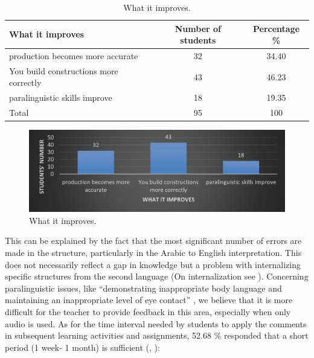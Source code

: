 \documentclass[english]{textolivre}
\begin{document}
\begin{table}[h!]
\centering
\begin{threeparttable}
\caption{What it improves.}
\label{tbl8}
\centering
\begin{tabular}{p{} c c}
\toprule
What it improves & Number of students & Percentage \% \\ \midrule
production becomes more accurate & 32 & 34.40 \\
You build constructions more correctly & 43 & 46.23 \\
paralinguistic skills improve & 18 & 19.35 \\
Total & 95 & 100 \\
\bottomrule
\end{tabular}
\end{threeparttable}
\end{table}

\begin{figure}[h!]
 \centering
 \begin{minipage}{.85\textwidth}
 \includegraphics[width=\textwidth]{08.jpg}
 \caption{What it improves.}
 \label{fig08}
 \end{minipage}
\end{figure}

This can be explained by the fact that the most significant number of errors are made in the structure, particularly in the Arabic to English interpretation. This does not necessarily reflect a gap in knowledge but a problem with internalizing specific structures from the second language (On internalization see \cite{chappell_sociocultural_2012}). Concerning paralinguistic issues, like “demonstrating inappropriate body language and maintaining an inappropriate level of eye contact” \cite[p. 821]{ko_teaching_2009}, we believe that it is more difficult for the teacher to provide feedback in this area, especially when only audio is used. As for the time interval needed by students to apply the comments in subsequent learning activities and assignments, 52.68 \% responded that a short period (1 week- 1 month) is sufficient (, ):
\end{document}
